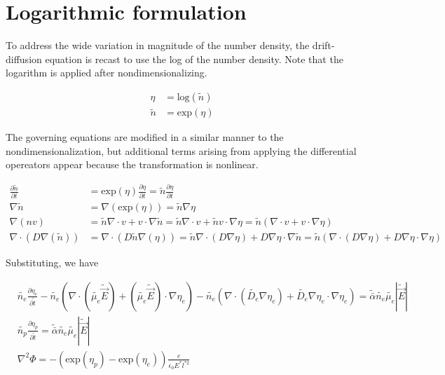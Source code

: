 \documentclass[11pt]{article}
\begin{document}
\section{Logarithmic formulation}

To address the wide variation in magnitude of the number density, the drift-diffusion equation is recast to use the log of the number density. Note that the logarithm is applied after nondimensionalizing.

\begin{align}
    \eta &= \mathrm{log}(\tilde{n})\\
    \tilde{n} &= \mathrm{exp}(\eta)
\end{align}

The governing equations are modified in a similar manner to the nondimensionalization, but additional terms arising from applying the differential opereators appear because the transformation is nonlinear.

\begin{align}
    \frac{\partial \tilde{n}}{\partial t} &= \mathrm{exp}(\eta)\frac{\partial \eta}{\partial t} = \tilde{n}\frac{\partial \eta}{\partial t}\\
    \nabla \tilde{n} &= \nabla (\mathrm{exp}(\eta)) = \tilde{n} \nabla \eta\\
    \nabla(nv) &= \tilde{n}\nabla \cdot v + v\cdot\nabla \tilde{n} = \tilde{n}\nabla \cdot v + \tilde{n}v\cdot\nabla \eta = \tilde{n}(\nabla \cdot v + v\cdot \nabla \eta)\\
    \nabla \cdot (D\nabla(\tilde{n})) &= \nabla \cdot (D\tilde{n}\nabla(\eta)) = \tilde{n}\nabla \cdot (D \nabla \eta) + D\nabla\eta\cdot \nabla\tilde{n} = \tilde{n}(\nabla \cdot (D \nabla \eta) + D\nabla\eta\cdot \nabla\eta)
\end{align}

Substituting, we have

\begin{align}
    &\tilde{n_e} \frac{\partial \eta_e}{\partial \tilde{t}} - \tilde{n_e}\left(\nabla \cdot \left( \tilde{\mu_e}\tilde{\vec{E}} \right) + \left( \tilde{\mu_e}\tilde{\vec{E}} \right)\cdot \nabla \eta_e\right) - \tilde{n_e}\left(\nabla \cdot (\tilde{D_e} \nabla \eta_e) + \tilde{D_e}\nabla \eta_e\cdot \nabla\eta_e \right) = \tilde{\bar{\alpha}}\tilde{n_e}\tilde{\mu_e}|\tilde{\vec{E}}|\\
    &\tilde{n_p} \frac{\partial \eta_p}{\partial \tilde{t}} = \tilde{\bar{\alpha}}\tilde{n_e}\tilde{\mu_e}|\tilde{\vec{E}}|\\
    &\nabla^2\Phi = -\left( \mathrm{exp}(\eta_p)-\mathrm{exp}(\eta_e) \right) \frac{e}{\epsilon_0 E^* l^{*2}}
\end{align}
\end{document}
